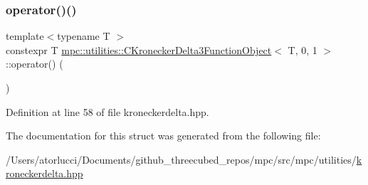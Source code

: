 \subsubsection{\texorpdfstring{operator()()}{operator()()}}
{\footnotesize\ttfamily template$<$typename T $>$ \\
constexpr T \mbox{\hyperlink{structmpc_1_1utilities_1_1_c_kronecker_delta3_function_object}{mpc\+::utilities\+::\+C\+Kronecker\+Delta3\+Function\+Object}}$<$ T, 0, 1 $>$\+::operator() (\begin{DoxyParamCaption}{ }\end{DoxyParamCaption})\hspace{0.3cm}{\ttfamily [inline]}}



Definition at line 58 of file kroneckerdelta.\+hpp.



The documentation for this struct was generated from the following file\+:\begin{DoxyCompactItemize}
\item 
/\+Users/atorlucci/\+Documents/github\+\_\+threecubed\+\_\+repos/mpc/src/mpc/utilities/\mbox{\hyperlink{kroneckerdelta_8hpp}{kroneckerdelta.\+hpp}}\end{DoxyCompactItemize}
